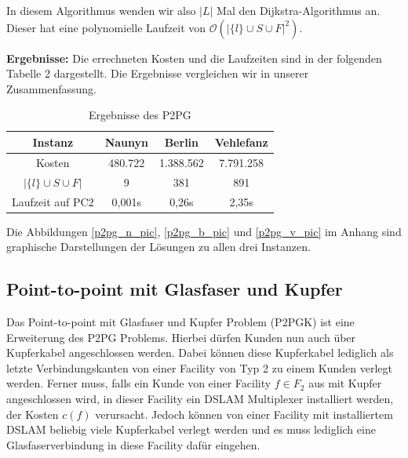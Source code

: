 \documentclass[11pt,a4paper]{article}
\theoremstyle{my_th_style1}
\begin{document}
In diesem Algorithmus wenden wir also $|L|$ Mal den Dijkstra-Algorithmus an.
Dieser hat eine polynomielle Laufzeit von \(\mathcal{O} ( {|\{l\} \cup S \cup F |}^2 )\).

\textbf{Ergebnisse:} Die errechneten Kosten und die Laufzeiten sind in der folgenden Tabelle 2 dargestellt.
Die Ergebnisse vergleichen wir in unserer Zusammenfassung.
\begin{table}[h]
	\centering
	\begin{tabular}{c|c|c|c}
		 Instanz & Naunyn & Berlin & Vehlefanz \\	
		\hline
		Kosten & 480.722 & 1.388.562 & 7.791.258 \\
		\( |\{l\} \cup S \cup F | \) & 9 & 381 & 891 \\
		Laufzeit auf PC2 & 0,001s & 0,26s & 2,35s\\
	\end{tabular}
	\label{P2PG}
	\caption{Ergebnisse des P2PG} 
\end{table}
Die Abbildungen \eqref{p2pg_n_pic}, \eqref{p2pg_b_pic} und \eqref{p2pg_v_pic} im Anhang sind graphische Darstellungen der L\"osungen zu allen drei Instanzen.



\subsection{Point-to-point mit Glasfaser und Kupfer}
Das Point-to-point mit Glasfaser und Kupfer Problem (P2PGK) ist eine Erweiterung des P2PG Problems.
Hierbei d\"urfen Kunden nun auch \"uber Kupferkabel angeschlossen werden.
Dabei k\"onnen diese Kupferkabel lediglich als letzte Verbindungskanten von einer Facility von Typ 2 zu einem Kunden verlegt werden.
Ferner muss, falls ein Kunde von einer Facility \(f \in F_2\) aus mit Kupfer angeschlossen wird, in dieser Facility ein DSLAM Multiplexer installiert werden, der Kosten \(c (f)\) verursacht.
Jedoch k\"onnen von einer Facility mit installiertem DSLAM beliebig viele Kupferkabel verlegt werden und es muss lediglich eine Glasfaserverbindung in diese Facility daf\"ur eingehen.
\end{document}
